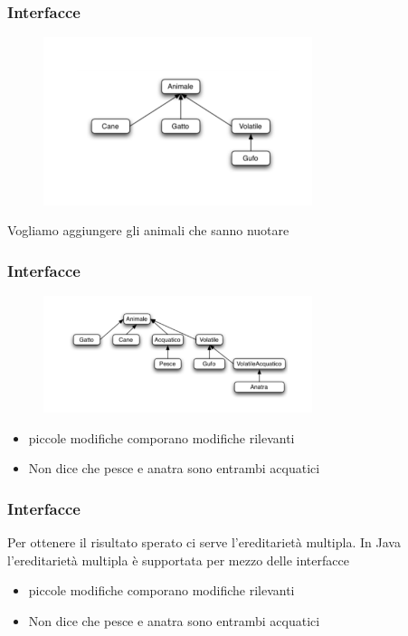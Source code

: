 \documentclass{beamer}
\begin{document}
\begin{frame}[fragile]
\frametitle{Interfacce}
\begin{figure}[h!]
  \centering
    \includegraphics[width=0.7\textwidth]{gerarchia2.pdf}
\end{figure}
Vogliamo aggiungere gli animali che sanno nuotare
\end{frame}


\begin{frame}[fragile]
\frametitle{Interfacce}
\begin{figure}[h!]
  \centering
    \includegraphics[width=0.7\textwidth]{gerarchia3.pdf}
\end{figure}
\begin{itemize}
\item  piccole modifiche comporano modifiche rilevanti
\item Non dice che pesce e anatra sono entrambi acquatici
\end{itemize}
\end{frame}

\begin{frame}[fragile]
\frametitle{Interfacce}
Per ottenere il risultato sperato ci serve l'ereditariet\`a multipla. In Java l'ereditariet\`a multipla \`e supportata per mezzo delle interfacce
\begin{itemize}
\item  piccole modifiche comporano modifiche rilevanti
\item Non dice che pesce e anatra sono entrambi acquatici
\end{itemize}
\end{frame}
\end{document}
